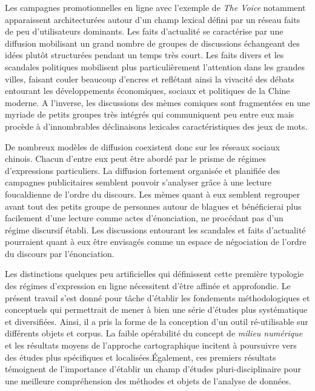 Les campagnes promotionnelles en ligne avec l’exemple de \textit{The Voice} notamment apparaissent architecturées autour d'un champ lexical défini par un réseau faits de peu d'utilisateurs dominants. Les faits d'actualité se caractérise par une diffusion mobilisant un grand nombre de groupes de discussions échangeant des idées plutôt structurées pendant un temps très court. Les faits divers et les scandales politiques mobilisent plus particulièrement l'attention dans les grandes villes, faisant couler beaucoup d'encres et reflétant ainsi la vivacité des débats entourant les développements économiques, sociaux et politiques de la Chine moderne. A l’inverse, les discussions des mèmes comiques sont fragmentées en une myriade de petits groupes très intégrés qui communiquent peu entre eux mais procède à d'innombrables déclinaisons lexicales caractéristiques des jeux de mots.

De nombreux modèles de diffusion coexistent donc sur les réseaux sociaux chinois. Chacun d'entre eux peut être abordé par le prisme de régimes d'expressions particuliers. La diffusion fortement organisée et planifiée des campagnes publicitaires semblent pouvoir s'analyser grâce à une lecture foucaldienne de l'ordre du discours. Les mèmes quant à eux semblent regrouper avant tout des petits groupe de personnes autour de blagues et bénéficierai plus facilement d'une lecture comme actes d'énonciation, ne procédant pas d'un régime discursif établi. Les discussions entourant les scandales et faits d'actualité pourraient quant à eux être envisagés comme un espace de négociation de l'ordre du discours par l'énonciation.

Les distinctions quelques peu artificielles qui définissent cette première typologie des régimes d'expression en ligne nécessitent d'être affinée et approfondie. Le présent travail s'est donné pour tâche d'établir les fondements méthodologiques et conceptuels qui permettrait de mener à bien une série d'études plus systématique et diversifiées. Ainsi, il a pris la forme de la conception d'un outil ré-utilisable sur différents objets et corpus. La faible opérabilité du concept de \textit{milieu numérique} et les résultats moyens de l'approche cartographique incitent à poursuivre vers des études plus spécifiques et localisées.Également, ces premiers résultats témoignent de l'importance d'établir un champ d'études pluri-disciplinaire pour une meilleure compréhension des méthodes et objets de l'analyse de données. 


